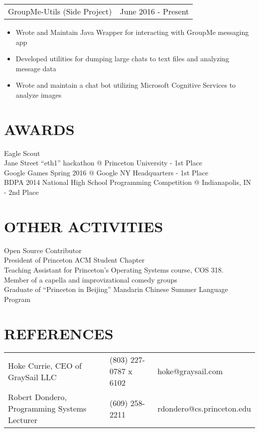 \documentclass[margin]{res}
\begin{document}
\begin{resume}
    \begin{tabular}{p{3.5in} p{3in}}
        GroupMe-Utils (Side Project) & June 2016 - Present
    \end{tabular}
    \begin{itemize} \itemsep -2pt
        \item Wrote and Maintain Java Wrapper for interacting with GroupMe messaging app
        \item Developed utilities for dumping large chats to text files and analyzing message data
        \item Wrote and maintain a chat bot utilizing Microsoft Cognitive Services to analyze images
    \end{itemize}
\section{AWARDS}
            Eagle Scout \\
            Jane Street ``eth1'' hackathon @ Princeton University - 1st Place \\
            Google Games Spring 2016 @ Google NY Headquarters - 1st Place \\
            BDPA 2014 National High School Programming Competition @ Indianapolis, IN - 2nd Place

\section{OTHER ACTIVITIES}
            Open Source Contributor \\
            President of Princeton ACM Student Chapter\\
            Teaching Assistant for Princeton's Operating Systems course, COS 318.\\
            Member of a capella and improvizational comedy groups\\
            Graduate of ``Princeton in Beijing'' Mandarin Chinese Summer Language Program

\section{REFERENCES}
    \hspace*{-.60in}
    \begin{tabular}{p{2.75in} p{1.25in} p{2in}}
            Hoke Currie, CEO of GraySail LLC & (803) 227-0787 x 6102 & hoke@graysail.com \\
            Robert Dondero, Programming Systems Lecturer & (609) 258-2211 & rdondero@cs.princeton.edu
    \end{tabular}
 

 
\end{resume} 
\end{document}
